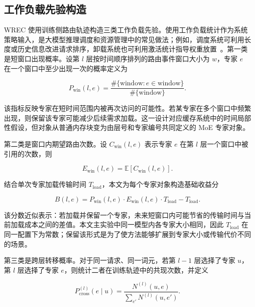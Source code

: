 \subsection{工作负载先验构造}

WREC 使用训练侧路由轨迹构造三类工作负载先验。使用工作负载统计作为系统策略输入，是大模型推理调度和资源管理中的常见做法；例如，调度系统可利用长度或历史信息改进请求排序，卸载系统也可利用激活统计指导权重放置~\cite{fu2024efficient,gong2024pastfuture,xue2024moeinfinity}。第一类是短窗口出现概率。设第 $l$ 层按时间顺序排列的路由事件窗口大小为 $w$，专家 $e$ 在一个窗口中至少出现一次的概率定义为

\begin{equation}
    \label{equ:wrec-window-prob}
    P_{\mathrm{win}}(l,e)=
    \frac{\#\{\mathrm{window}:e\in \mathrm{window}\}}{\#\{\mathrm{window}\}}.
\end{equation}

该指标反映专家在短时间范围内被再次访问的可能性。若某专家在多个窗口中频繁出现，则保留该专家可能减少后续需求加载。这一设计对应缓存系统中的时间局部性假设，但对象从普通内存块变为由层号和专家编号共同定义的 MoE 专家对象。

第二类是窗口内期望路由次数。设 $C_{\mathrm{win}}(l,e)$ 表示专家 $e$ 在第 $l$ 层一个窗口中被引用的次数，则

\begin{equation}
    \label{equ:wrec-window-count}
    E_{\mathrm{win}}(l,e)=\mathbb{E}[C_{\mathrm{win}}(l,e)].
\end{equation}

结合单次专家加载传输时间 $T_{\mathrm{load}}$，本文为每个专家对象构造基础收益分

\begin{equation}
    \label{equ:wrec-base-score}
    B(l,e)=P_{\mathrm{win}}(l,e)\cdot E_{\mathrm{win}}(l,e)\cdot T_{\mathrm{load}}-T_{\mathrm{load}}.
\end{equation}

该分数近似表示：若加载并保留一个专家，未来短窗口内可能节省的传输时间与当前加载成本之间的差值。本文主实验中同一模型内各专家大小相同，因此 $T_{\mathrm{load}}$ 在同一配置下为常数；保留该形式是为了使方法能够扩展到专家大小或传输代价不同的场景。

第三类是跨层转移概率。对于同一请求、同一词元，若第 $l-1$ 层选择了专家 $u$，第 $l$ 层选择了专家 $e$，则统计二者在训练轨迹中的共现次数，并定义

\begin{equation}
    \label{equ:wrec-cross-prob}
    P_{\mathrm{cross}}^{(l)}(e\mid u)=
    \frac{N^{(l)}(u,e)}{\sum_{e'}N^{(l)}(u,e')}.
\end{equation}

